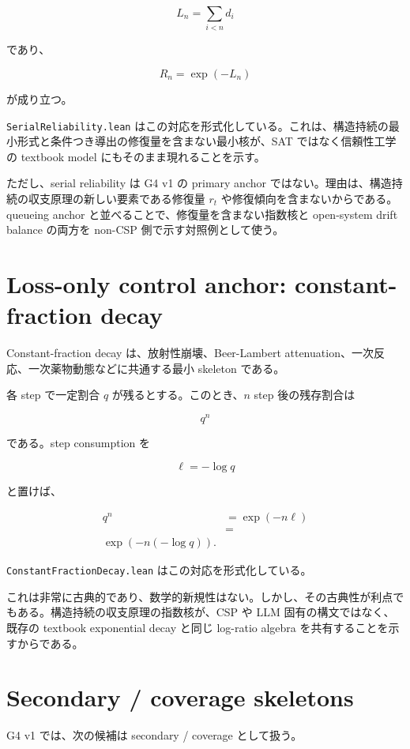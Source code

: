\documentclass[12pt,a4paper]{article}
\begin{document}
\[
L_{n}=\sum_{i<n}d_{i}
\]

であり、

\[
R_{n}=\exp(-L_{n})
\]

が成り立つ。

\texttt{SerialReliability.lean} はこの対応を形式化している。これは、構造持続の最小形式と条件つき導出の修復量を含まない最小核が、SAT ではなく信頼性工学の textbook model にもそのまま現れることを示す。

ただし、serial reliability は G4 v1 の primary anchor ではない。理由は、構造持続の収支原理の新しい要素である修復量 \(r_{t}\) や修復傾向を含まないからである。queueing anchor と並べることで、修復量を含まない指数核と open-system drift balance の両方を non-CSP 側で示す対照例として使う。

\section{Loss-only control anchor: constant-fraction decay}\label{loss-only-control-anchor-constant-fraction-decay}

Constant-fraction decay は、放射性崩壊、Beer-Lambert attenuation、一次反応、一次薬物動態などに共通する最小 skeleton である。

各 step で一定割合 \(q\) が残るとする。このとき、\(n\) step 後の残存割合は

\[
q^n
\]

である。step consumption を

\[
\ell=-\log q
\]

と置けば、

\[
\begin{aligned}
q^n&=\exp(-n\ell) \\
&= \\
\exp(-n(-\log q)).
\end{aligned}
\]

\texttt{ConstantFractionDecay.lean} はこの対応を形式化している。

これは非常に古典的であり、数学的新規性はない。しかし、その古典性が利点でもある。構造持続の収支原理の指数核が、CSP や LLM 固有の構文ではなく、既存の textbook exponential decay と同じ log-ratio algebra を共有することを示すからである。

\section{Secondary / coverage skeletons}\label{secondary-coverage-skeletons}

G4 v1 では、次の候補は secondary / coverage として扱う。
\end{document}
